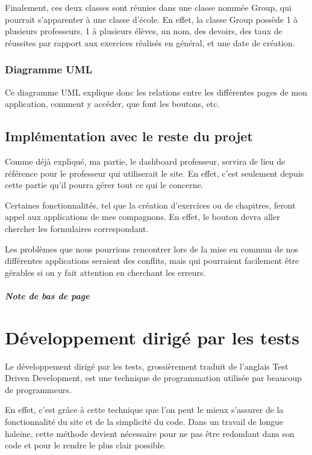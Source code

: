 \documentclass[letterpaper,10pt,french]{sphinxmanual}
\begin{document}
Finalement, ces deux classes sont réunies dans une classe nommée Group, qui
pourrait s'apparenter à une classe d'école. En effet, la classe Group possède
1 à plusieurs professeurs, 1 à plusieurs élèves, un nom, des devoirs, des
taux de réussites par rapport aux exercices réalisés en général, et une date
de création.


\subsection{Diagramme UML}
\label{documentation:diagramme-uml}
Ce diagramme UML explique donc les relations entre les différentes pages de mon
application, comment y accéder, que font les boutons, etc.


\section{Implémentation avec le reste du projet}
\label{documentation:implementation-avec-le-reste-du-projet}
Comme déjà expliqué, ma partie, le dashboard professeur, servira de lieu de
référence pour le professeur qui utiliserait le site. En effet, c'est seulement
depuis cette partie qu'il pourra gérer tout ce qui le concerne.

Certaines fonctionnalités, tel que la création d'exercices ou de chapitres,
feront appel aux applications de mes compagnons. En effet, le bouton devra aller
chercher les formulaires correspondant.

Les problèmes que nous pourrions rencontrer lors de la mise en commun de nos
différentes applications seraient des conflits, mais qui pourraient facilement
être gérables si on y fait attention en cherchant les erreurs.
\paragraph{Note de bas de page}


\chapter{Développement dirigé par les tests}
\label{tdd::doc}\label{tdd:developpement-dirige-par-les-tests}
Le développement dirigé par les tests, grossièrement traduit de l'anglais Test
Driven Development, est une technique de programmation utilisée par beaucoup de
programmeurs.

En effet, c'est grâce à cette technique que l'on peut le mieux s'assurer de la
fonctionnalité du site et de la simplicité du code. Dans un travail de longue
haleine, cette méthode devient nécessaire pour ne pas être redondant dans son
code et pour le rendre le plus clair possible.
\end{document}
